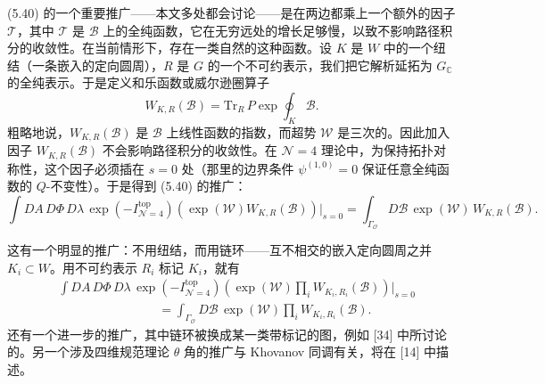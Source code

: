 \documentclass[11pt,a4paper,UTF8]{ctexart}
\theoremstyle{plain}
\theoremstyle{definition}
\begin{document}

(5.40) 的一个重要推广——本文多处都会讨论——是在两边都乘上一个额外的因子 $\mathcal{T}$，其中 $\mathcal{T}$ 是 $\mathcal{B}$ 上的全纯函数，它在无穷远处的增长足够慢，以致不影响路径积分的收敛性。在当前情形下，存在一类自然的这种函数。设 $K$ 是 $W$ 中的一个纽结（一条嵌入的定向圆周），$R$ 是 $G$ 的一个不可约表示，我们把它解析延拓为 $G_{\mathbb{C}}$ 的全纯表示。于是定义和乐函数或威尔逊圈算子
\begin{equation}
    W_{K,R}(\mathcal{B})=\mathrm{Tr}_R\,P\exp\oint_K \mathcal{B}.
    \tag{5.41}
\end{equation}
粗略地说，$W_{K,R}(\mathcal{B})$ 是 $\mathcal{B}$ 上线性函数的指数，而超势 $\mathcal{W}$ 是三次的。因此加入因子 $W_{K,R}(\mathcal{B})$ 不会影响路径积分的收敛性。在 $\mathcal{N}=4$ 理论中，为保持拓扑对称性，这个因子必须插在 $s=0$ 处（那里的边界条件 $\psi^{(1,0)}=0$ 保证任意全纯函数的 $Q$-不变性）。于是得到 (5.40) 的推广：
\begin{equation}
    \int DA\,D\Phi\,D\lambda\,\exp(-I^{\mathrm{top}}_{\mathcal{N}=4})\left(\exp(\mathcal{W})W_{K,R}(\mathcal{B})\right)\Big|_{s=0}=\int_{\Gamma_{\mathcal{O}}}D\mathcal{B}\,\exp(\mathcal{W})\,W_{K,R}(\mathcal{B}).
    \tag{5.42}
\end{equation}


这有一个明显的推广：不用纽结，而用链环——互不相交的嵌入定向圆周之并 $K_i\subset W$。用不可约表示 $R_i$ 标记 $K_i$，就有
\begin{equation}
    \begin{aligned}
        &\int DA\,D\Phi\,D\lambda\,\exp(-I^{\mathrm{top}}_{\mathcal{N}=4})\left(\exp(\mathcal{W})\prod_i W_{K_i,R_i}(\mathcal{B})\right)\Big|_{s=0}\\
        &\qquad\qquad\qquad\qquad=\int_{\Gamma_{\mathcal{O}}}D\mathcal{B}\,\exp(\mathcal{W})\prod_i W_{K_i,R_i}(\mathcal{B}).
    \end{aligned}
    \tag{5.43}
\end{equation}
还有一个进一步的推广，其中链环被换成某一类带标记的图，例如 [34] 中所讨论的。另一个涉及四维规范理论 $\theta$ 角的推广与 Khovanov 同调有关，将在 [14] 中描述。
\end{document}
